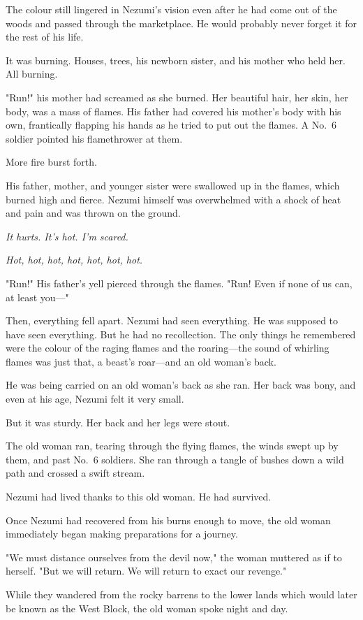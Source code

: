 The colour still lingered in Nezumi's vision even after he had come out
of the woods and passed through the marketplace. He would probably never
forget it for the rest of his life.

It was burning. Houses, trees, his newborn sister, and his mother who
held her. All burning.

"Run!" his mother had screamed as she burned. Her beautiful hair, her
skin, her body, was a mass of flames. His father had covered his
mother's body with his own, frantically flapping his hands as he tried
to put out the flames. A No.~6 soldier pointed his flamethrower at them.

More fire burst forth.

His father, mother, and younger sister were swallowed up in the flames,
which burned high and fierce. Nezumi himself was overwhelmed with a
shock of heat and pain and was thrown on the ground.

\emph{It hurts. It's hot. I'm scared.}

\emph{Hot, hot, hot, hot, hot, hot, hot.}

"Run!" His father's yell pierced through the flames. "Run! Even if none
of us can, at least you---"

Then, everything fell apart. Nezumi had seen everything. He was supposed
to have seen everything. But he had no recollection. The only things he
remembered were the colour of the raging flames and the roaring---the
sound of whirling flames was just that, a beast's roar---and an old
woman's back.

He was being carried on an old woman's back as she ran. Her back was
bony, and even at his age, Nezumi felt it very small.

But it was sturdy. Her back and her legs were stout.

The old woman ran, tearing through the flying flames, the winds swept up
by them, and past No.~6 soldiers. She ran through a tangle of bushes
down a wild path and crossed a swift stream.

Nezumi had lived thanks to this old woman. He had survived.

Once Nezumi had recovered from his burns enough to move, the old woman
immediately began making preparations for a journey.

"We must distance ourselves from the devil now," the woman muttered as
if to herself. "But we will return. We will return to exact our
revenge."

While they wandered from the rocky barrens to the lower lands which
would later be known as the West Block, the old woman spoke night and
day.


